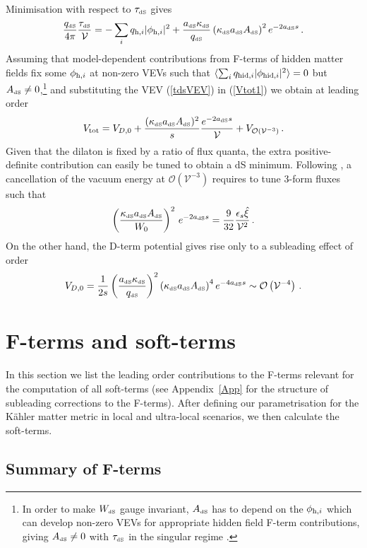 \documentclass[11pt,a4paper]{article}
\newcommand{\be}{\begin{equation}}
\newcommand{\ee}{\end{equation}}
\def\dS{{\scriptscriptstyle \rm dS}}
\newcommand\vo{{\mathcal{V}}}
\newcommand{\mc}{\mathcal}
\begin{document}
Minimisation with respect to $\tau_\dS$ gives
\be
\frac{q_\dS}{4\pi} \frac{\tau_\dS}{\vo}=- \sum_i q_{{\rm h},i} |\phi_{{\rm h},i}|^2
+ \frac{a_\dS \kappa_\dS}{q_\dS}\left(\kappa_\dS a_\dS A_\dS\right)^2 e^{-2 a_\dS s}\,.
\label{tdsVEV}
\ee
Assuming that model-dependent contributions from F-terms of hidden matter fields fix some $\phi_{{\rm h}, i}$ at non-zero VEVs
such that $\langle\sum_i q_{{\rm hid},i} |\phi_{{\rm hid},i}|^2\rangle = 0$ but $A_\dS\neq 0$,\footnote{In order to make $W_\dS$ gauge invariant,
$A_\dS$ has to depend on the $\phi_{{\rm h},i}$ which can develop non-zero VEVs for appropriate hidden field F-term contributions, giving $A_\dS\neq 0$ with $\tau_\dS$ in the singular regime \cite{Cicoli:2012fh}.} and substituting the VEV (\ref{tdsVEV}) in (\ref{Vtot1}) we obtain at leading order
\be
V_{\rm tot} = V_{D,0}+ \frac{(\kappa_\dS a_\dS A_\dS)^2}{s} \frac{e^{-2 a_\dS s}}{\vo} + V_{\mc{O}(\vo^{-3})}\,.
\ee
Given that the dilaton is fixed by a ratio of flux quanta,
the extra positive-definite contribution can easily be tuned to obtain a dS minimum. Following \cite{Cicoli:2012fh}, a cancellation of the vacuum energy
at $\mc{O}(\vo^{-3})$ requires to tune 3-form fluxes such that
\be
\left(\frac{\kappa_\dS a_\dS A_\dS}{W_0}\right)^2 \,e^{-2 a_\dS s}
= \frac{9}{32} \frac{\epsilon_s \hat\xi}{\vo^2}\,.
\label{CCconddS2}
\ee
On the other hand, the D-term potential gives rise only to a subleading effect of order
\be
V_{D,0} =\frac{1}{2s} \left(\frac{a_\dS \kappa_\dS}{q_\dS}\right)^2\left(\kappa_\dS a_\dS A_\dS\right)^4 e^{-4 a_\dS s}\sim \mc{O}\left(\vo^{-4}\right)\,.
\label{VD0ds2}
\ee

\section{F-terms and soft-terms}
\label{sec:ftermsandsoftmasses}

In this section we list the leading order contributions to the F-terms relevant for the computation of all soft-terms (see Appendix~\ref{App} for the structure of subleading corrections to the F-terms). After defining our parametrisation for the K\"ahler matter metric in local and ultra-local scenarios, we then calculate the soft-terms.

\subsection{Summary of F-terms}
\label{fterms}
\end{document}
